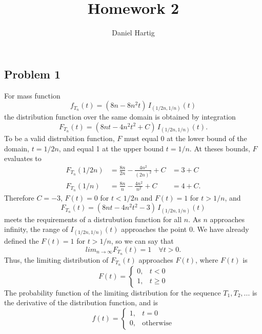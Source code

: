 \documentclass{article}
\title{Homework 2}
\author{Daniel Hartig}
\begin{document}
\maketitle

\subsection*{Problem 1}

For mass function $$f_{T_n}(t) = (8n-8n^2t)\, I_{(1/2n, 1/n)}(t)$$ the distribution function over the same domain is obtained by integration $$F_{T_n}(t) = (8nt - 4n^2t^2 + C)\, I_{(1/2n, 1/n)}(t).$$ To be a valid distrubition function, $F$ must equal 0 at the lower bound of the domain, $t = 1/2n$, and equal 1 at the upper bound $t = 1/n$. At theses bounds, $F$ evaluates to 
\[\begin{aligned}
F_{T_n}(1/2n) &= \frac{8n}{2n} - \frac{4n^2}{(2n)^2} + C &= 3 + C \\
F_{T_n}(1/n)&= \frac{8n}{n} - \frac{4n^2}{n^2} + C &= 4 + C.
\end{aligned}\]
Therefore $C = -3$, $F(t) = 0$ for $ t<1/2n$ and $F(t) = 1$ for $ t > 1/n$, and \[F_{T_n}(t) = (8nt - 4n^2t^2 -3)\, I_{(1/2n, 1/n)}(t)\] meets the requirements of a distrubution function for all $n$. As $n$ approaches infinity, the range of $I_{(1/2n, 1/n)}(t)$ approaches the point $0$. We have already defined the $F(t) = 1$ for $ t > 1/n$, so we can say that \[lim_{n\to\infty} F_{T_n}(t) = 1\quad \forall t > 0.\] Thus, the limiting distribution of $F_{T_n}(t)$ approaches $F(t)$, where $F(t)$ is 
\[F(t) = \begin{cases}
0, &t < 0 \\
1, &t \geq 0 \end{cases}\] The probability function of the limiting distribution for the sequence $T_1, T_2, ...$ is the derivative of the distribution function, and is 
\[f(t) = \begin{cases}
1, &t = 0 \\
0, &\text{otherwise}
\end{cases}\]

\iffalse
As $n\to\infty$, the mass function \[f_{T_n}(t) = (8n-8n^2t)\, I_{(1/2n, 1/n)}(t)\] approaches different values in its upper and lower bounds in $t$. At $t = 1/n$, \[\lim_{n\to\infty} (8n-8n^2t) = \lim_{n\to\infty} 8n-\frac{8n^2}{n} = 0.\] while at $t=1/2n$, \[\lim_{n\to\infty} (8n-8n^2t) = \lim_{n\to\infty} 8n-\frac{8n^2}{2n} = \lim_{n\to\infty} 4n = \infty.\] Meanwhile the domain of $t$ becomes $(1/2n, 1/n) = (0, 0)$. Thus the limiting distribution for $f_{T_n}$ is a vertical line at $t=0$, where the image of $f_{T_n}$ is all non-negative real numbers. 
\fi
\end{document}
